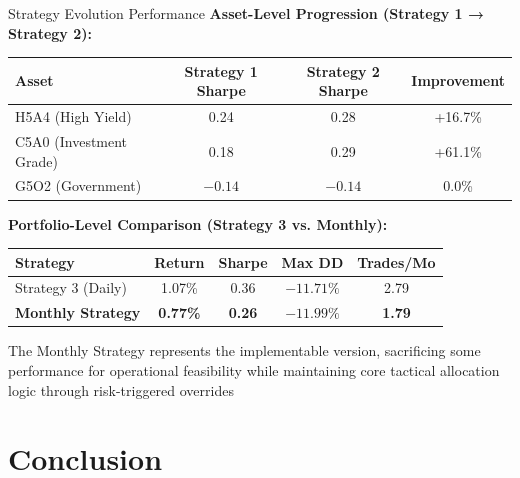 \documentclass[aspectratio=169,10pt]{beamer}
\begin{document}
\begin{frame}{Strategy Evolution Performance}
\textbf{Asset-Level Progression (Strategy 1 → Strategy 2):}

\vspace{0.2cm}

\begin{center}
\begin{tabular}{lccc}
\toprule
\textbf{Asset} & \textbf{Strategy 1 Sharpe} & \textbf{Strategy 2 Sharpe} & \textbf{Improvement} \\
\midrule
H5A4 (High Yield) & 0.24 & 0.28 & +16.7\% \\
C5A0 (Investment Grade) & 0.18 & 0.29 & +61.1\% \\
G5O2 (Government) & $-0.14$ & $-0.14$ & 0.0\% \\
\bottomrule
\end{tabular}
\end{center}

\vspace{0.4cm}

\textbf{Portfolio-Level Comparison (Strategy 3 vs. Monthly):}

\vspace{0.2cm}

\begin{center}
\begin{tabular}{lcccc}
\toprule
\textbf{Strategy} & \textbf{Return} & \textbf{Sharpe} & \textbf{Max DD} & \textbf{Trades/Mo} \\
\midrule
Strategy 3 (Daily) & 1.07\% & 0.36 & $-11.71\%$ & 2.79 \\
\textbf{Monthly Strategy} & \textbf{0.77\%} & \textbf{0.26} & \textbf{$-11.99\%$} & \textbf{1.79} \\
\bottomrule
\end{tabular}
\end{center}

\vspace{0.3cm}

The Monthly Strategy represents the implementable version, sacrificing some performance for operational feasibility while maintaining core tactical allocation logic through risk-triggered overrides
\end{frame}

\section{Conclusion}
\end{document}
